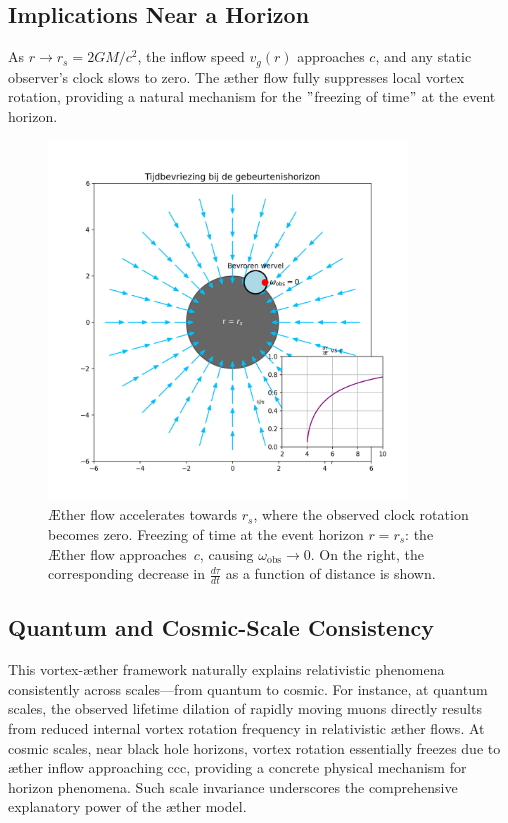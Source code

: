 \subsection*{Implications Near a Horizon}

As $r \to r_s = 2GM/c^2$, the inflow speed $v_g(r)$ approaches $c$, and any static observer's clock slows to zero. The æther flow fully suppresses local vortex rotation, providing a natural mechanism for the \("\)freezing of time\("\) at the event horizon.

\begin{figure}[htbp]
    \centering
    \includegraphics[width=0.85\textwidth]{../10-HorizonTijdsbevriezing}
    \caption{Æther flow accelerates towards $r_s$, where the observed clock rotation becomes zero. Freezing of time at the event horizon $r = r_s$: the Æther flow approaches~$c$, causing $\omega_{\mathrm{obs}} \to 0$. On the right, the corresponding decrease in $\frac{d\tau}{dt}$ as a function of distance is shown.}
    \label{fig:HorizonTijdsbevriezing}
\end{figure}


\subsection*{Quantum and Cosmic-Scale Consistency}

This vortex-æther framework naturally explains relativistic phenomena consistently across scales—from quantum to cosmic. For instance, at quantum scales, the observed lifetime dilation of rapidly moving muons directly results from reduced internal vortex rotation frequency in relativistic æther flows. At cosmic scales, near black hole horizons, vortex rotation essentially freezes due to æther inflow approaching ccc, providing a concrete physical mechanism for horizon phenomena. Such scale invariance underscores the comprehensive explanatory power of the æther model.


